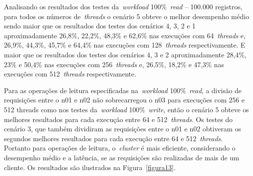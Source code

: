 \documentclass[12pt]{article}
\begin{document}
Analisando os resultados dos testes da~\emph{workload} 100\%~\emph{read} -- 100.000 registros, para todos os números de~\emph{threads} o cenário 5 obteve o melhor desempenho médio sendo maior que os resultados dos testes dos cenários 4, 3, 2 e 1 aproximadamente 26,8\%, 22,2\%, 48,3\% e 62,6\% nas execuções com 64~\emph{threads} e, 26,9\%, 44,3\%, 45,7\% e 64,4\% nas execuções com 128~\emph{threads} respectivamente. 
E maior que os resultados dos testes dos cenários 4, 3 e 2 aproximadamente 28,4\%, 23\% e 50,4\% nas execuções com 256~\emph{threads} e, 26,5\%, 18,2\% e 47,3\% nas execuções com 512~\emph{threads} respectivamente.

Para as operações de leitura especificadas na~\emph{workload} 100\%~\emph{read}, a divisão de requisições entre o n01 e n02 não sobrecarregou o n03 para execuções com 256 e 512 threads como nos testes da~\emph{workload} 100\%~\emph{write}, então o cenário 5 obteve os melhores resultados para cada execução entre 64 e 512~\emph{threads}. 
Os testes do cenário 3, que também dividiram as requisições entre o n01 e n02 obtiveram os segundos melhores resultados para cada execução entre 64 e 512~\emph{threads}. 
Portanto para operações de leitura, o~\emph{cluster}  é mais eficiente, considerando o desempenho médio e a latência, se as requisições são realizadas de mais de um cliente. 
Os resultados são ilustrados na Figura~\ref{figura13}.
\end{document}
